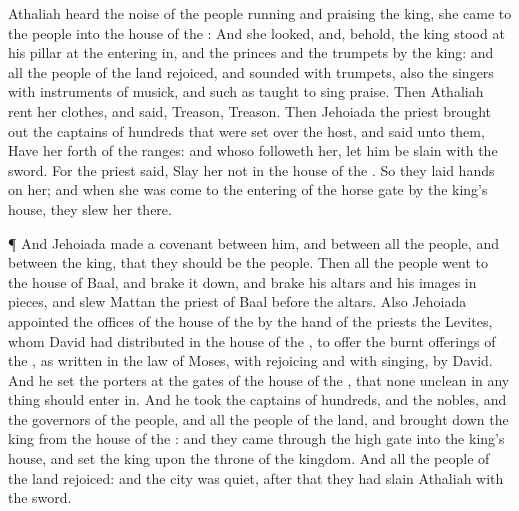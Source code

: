 {Athaliah
heard the
noise of the
people
running and
praising the
king, she
came to the
people into the
house of the
{}:
And she
looked, and, behold, the
king
stood at his
pillar at the entering
in, and the
princes and the
trumpets by the
king: and all the
people of the
land
rejoiced, and
sounded with
trumpets, also the
singers with
instruments of
musick, and such as
taught to sing
praise. Then
Athaliah
rent her
clothes, and
said,
Treason,
Treason.
Then
Jehoiada the
priest brought
out the
captains of
hundreds that were set
over the
host, and
said unto them, Have her
forth of the
ranges: and whoso
followeth her, let him be
slain with the
sword. For the
priest
said,
Slay her not in the
house of the
{}.
So they
laid
hands on her; and when she was
come to the
entering of the
horse
gate by the
king’s
house, they
slew her there.
\par }{\PP {}¶ And
Jehoiada
made a
covenant between him, and between all the
people, and between the
king, that they should be the
{}
people.
Then all the
people
went to the
house of
Baal, and brake it
down, and
brake his
altars and his
images in
pieces, and
slew
Mattan the
priest of
Baal
before the
altars.
Also
Jehoiada
appointed the
offices of the
house of the
{} by the
hand of the
priests the
Levites, whom
David had
distributed in the
house of the
{}, to
offer the burnt
offerings of the
{}, as
{}
written in the
law of
Moses, with
rejoicing and with
singing,
{}
by
David.
And he
set the
porters at the
gates of the
house of the
{}, that none
{}
unclean in any
thing should enter
in.
And he
took the
captains of
hundreds, and the
nobles, and the
governors of the
people, and all the
people of the
land, and brought
down the
king from the
house of the
{}: and they
came
through the
high
gate into the
king’s
house, and
set the
king upon the
throne of the
kingdom.
And all the
people of the
land
rejoiced: and the
city was
quiet, after that they had
slain
Athaliah with the
sword.

}
